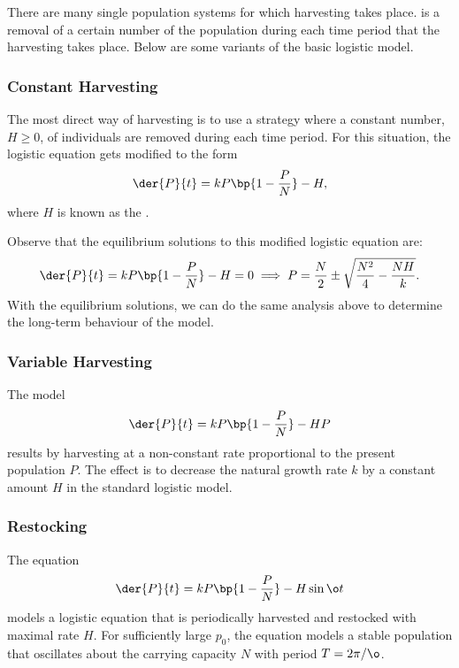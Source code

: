 There are many single population systems for which harvesting takes place.  is a removal of a certain number of the population during each time period that the harvesting takes place. Below are some variants of the basic logistic model.

\subsubsection{Constant Harvesting}

The most direct way of harvesting is to use a strategy where a constant number, $H \geq 0$, of individuals are removed during each time period. For this situation, the logistic equation gets modified to the form \[\der{P}{t} = kP\bp{1 - \frac{P}{N}} - H,\] where $H$ is known as the .

Observe that the equilibrium solutions to this modified logistic equation are: \[\der{P}{t} = kP\bp{1 - \frac{P}{N}} - H = 0 \implies P = \frac{N}{2} \pm \sqrt{\frac{N^2}{4} - \frac{NH}{k}}.\] With the equilibrium solutions, we can do the same analysis above to determine the long-term behaviour of the model.

\subsubsection{Variable Harvesting}

The model \[\der{P}{t} = kP \bp{1 - \frac{P}{N}} - HP\] results by harvesting at a non-constant rate proportional to the present population $P$. The effect is to decrease the natural growth rate $k$ by a constant amount $H$ in the standard logistic model.

\subsubsection{Restocking}

The equation \[\der{P}{t} = kP \bp{1 - \frac{P}{N}} - H \sin{\o t}\] models a logistic equation that is periodically harvested and restocked with maximal rate $H$. For sufficiently large $p_0$, the equation models a stable population that oscillates about the carrying capacity $N$ with period $T = 2\pi / \o$.